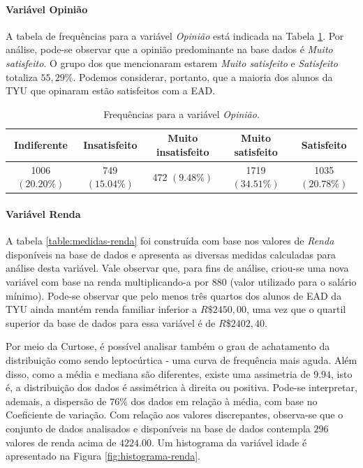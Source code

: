 \documentclass[10pt,a4paper,oneside]{article}
\begin{document}
\paragraph{Variável Opinião}

A tabela de frequências para a variável \textit{Opinião} está indicada na Tabela \ref{table:frequencias-opiniao}. Por análise, pode-se observar que a opinião predominante na base dados é \textit{Muito satisfeito}. O grupo dos que mencionaram estarem \textit{Muito satisfeito} e \textit{Satisfeito} totaliza $55,29\%$. Podemos considerar, portanto, que a maioria dos alunos da TYU que opinaram estão satisfeitos com a EAD.

\begin{table}[!h]
\centering
\caption{Frequências para a variável \textit{Opinião}.}
\vspace{0.5em}
\label{table:frequencias-opiniao}
\begin{tabular}{c c c c c}
	\toprule
	\textbf{Indiferente}    & \textbf{Insatisfeito}   & \textbf{Muito insatisfeito}  & \textbf{Muito satisfeito} & \textbf{Satisfeito} \\
	\midrule
	1006 $(20.20\%)$ & 749 $(15.04\%)$ & 472 $(9.48\%)$ & 1719 $(34.51\%)$ & 1035 $(20.78\%)$ \\
	\bottomrule
\end{tabular}
\end{table}


\paragraph{Variável Renda}
A tabela \ref{table:medidas-renda} foi construída com base nos valores de \textit{Renda} disponíveis na base de dados e apresenta as diversas medidas calculadas para análise desta variável. Vale observar que, para fins de análise, criou-se uma nova variável com base na renda multiplicando-a por 880 (valor utilizado para o salário mínimo). Pode-se observar que pelo menos três quartos dos alunos de EAD da TYU ainda mantém renda familiar inferior a $R\$2450,00$, uma vez que o quartil superior da base de dados para essa variável é de $R$\$$2402,40$.

Por meio da Curtose, é possível analisar também o grau de achatamento da distribuição como sendo leptocúrtica - uma curva de frequência mais aguda. Além disso, como a média e mediana são diferentes, existe uma assimetria de $9.94$, isto é, a distribuição dos dados é assimétrica à direita ou positiva. Pode-se interpretar, ademais, a dispersão de $76\%$ dos dados em relação à média, com base no Coeficiente de variação.
Com relação aos valores discrepantes, observa-se que o conjunto de dados analisados e disponíveis na base de dados contempla $296$ valores de renda acima de $4224.00$. Um histograma da variável idade é apresentado na Figura \ref{fig:histograma-renda}.
\end{document}
